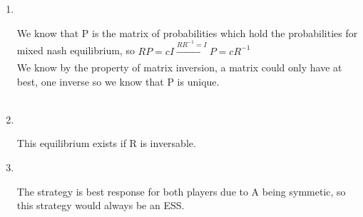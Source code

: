\noindent
\begin{enumerate}
    \item \phantom{text}
          \\
          \begin{latin}
              We know that P is the matrix of probabilities which hold the probabilities for mixed nash equilibrium, so $RP = cI \xrightarrow[]{RR^{-1}=I} P = cR^{-1}$ \\
              We know by the property of matrix inversion, a matrix could only have at best, one inverse so we know that P is unique. \\
              \\


          \end{latin}
    \item \phantom{text}
          \\
          \begin{latin}
              This equilibrium exists if R is inversable.\\
          \end{latin}
    \item \phantom{text}
          \\
        \begin{latin}
            The strategy is best response for both players due to A being symmetic, so this strategy would always be an ESS.
        \end{latin}
\end{enumerate}

